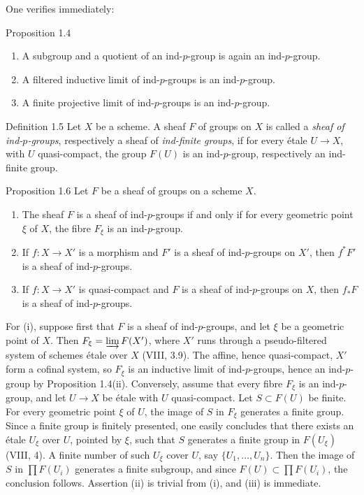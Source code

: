 One verifies immediately:

\begin{statement}{Proposition 1.4}
\begin{enumerate}[label=(\roman*)]
\item A subgroup and a quotient of an ind-\(p\)-group is again an ind-\(p\)-group.
\item A filtered inductive limit of ind-\(p\)-groups is an ind-\(p\)-group.
\item A finite projective limit of ind-\(p\)-groups is an ind-\(p\)-group.
\end{enumerate}
\end{statement}

\begin{statement}{Definition 1.5}
Let \(X\) be a scheme. A sheaf \(F\) of groups on \(X\) is called a \emph{sheaf of ind-\(p\)-groups}, respectively a sheaf of \emph{ind-finite groups}, if for every \'etale \(U\to X\), with \(U\) quasi-compact, the group \(F(U)\) is an ind-\(p\)-group, respectively an ind-finite group.
\end{statement}

\begin{statement}{Proposition 1.6}
Let \(F\) be a sheaf of groups on a scheme \(X\).
\begin{enumerate}[label=(\roman*)]
\item The sheaf \(F\) is a sheaf of ind-\(p\)-groups if and only if for every geometric point \(\xi\) of \(X\), the fibre \(F_\xi\) is an ind-\(p\)-group.
\item If \(f:X\to X'\) is a morphism and \(F'\) is a sheaf of ind-\(p\)-groups on \(X'\), then \(f^*F'\) is a sheaf of ind-\(p\)-groups.
\item If \(f:X\to X'\) is quasi-compact and \(F\) is a sheaf of ind-\(p\)-groups on \(X\), then \(f_*F\) is a sheaf of ind-\(p\)-groups.
\end{enumerate}
\end{statement}

\begin{prooftext}
For (i), suppose first that \(F\) is a sheaf of ind-\(p\)-groups, and let \(\xi\) be a geometric point of \(X\). Then \(F_\xi=\varinjlim F(X')\), where \(X'\) runs through a pseudo-filtered system of schemes \'etale over \(X\) (VIII, 3.9). The affine, hence quasi-compact, \(X'\) form a cofinal system, so \(F_\xi\) is an inductive limit of ind-\(p\)-groups, hence an ind-\(p\)-group by Proposition 1.4(ii). Conversely, assume that every fibre \(F_\xi\) is an ind-\(p\)-group, and let \(U\to X\) be \'etale with \(U\) quasi-compact. Let \(S\subset F(U)\) be finite. For every geometric point \(\xi\) of \(U\), the image of \(S\) in \(F_\xi\) generates a finite group. Since a finite group is finitely presented, one easily concludes that there exists an \'etale \(U_\xi\) over \(U\), pointed by \(\xi\), such that \(S\) generates a finite group in \(F(U_\xi)\) (\cf VIII, 4). A finite number of such \(U_\xi\) cover \(U\), say \(\{U_1,\ldots,U_n\}\). Then the image of \(S\) in \(\prod F(U_i)\) generates a finite subgroup, and since \(F(U)\subset\prod F(U_i)\), the conclusion follows. Assertion (ii) is trivial from (i), and (iii) is immediate.
\end{prooftext}
